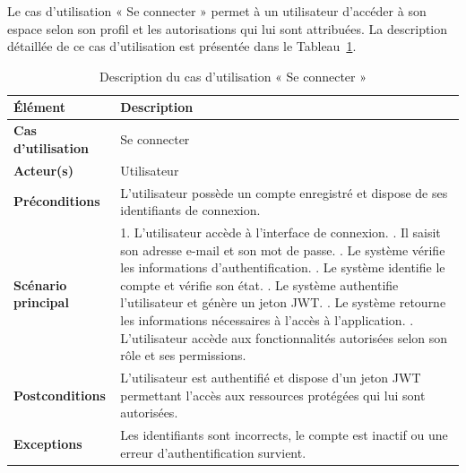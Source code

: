 Le cas d’utilisation « Se connecter » permet à un utilisateur d’accéder à son espace selon son profil et les autorisations qui lui sont attribuées. La description détaillée de ce cas d’utilisation est présentée dans le Tableau~\ref{tab:uc1}.

\begin{longtable}{|>{\raggedright\arraybackslash}p{4cm}|>{\raggedright\arraybackslash}p{10.5cm}|}

\caption{Description du cas d’utilisation « Se connecter »}
\label{tab:uc1}\\

\hline

\textbf{Élément} & \textbf{Description} \\

\hline

\textbf{Cas d’utilisation} & Se connecter \\

\hline

\textbf{Acteur(s)} & Utilisateur \\

\hline

\textbf{Préconditions} &
L'utilisateur possède un compte enregistré et dispose de ses identifiants de connexion. \\

\hline

\textbf{Scénario principal} &

1. L'utilisateur accède à l'interface de connexion. \newline
2. Il saisit son adresse e-mail et son mot de passe. \newline
3. Le système vérifie les informations d'authentification. \newline
4. Le système identifie le compte et vérifie son état. \newline
5. Le système authentifie l'utilisateur et génère un jeton JWT. \newline
6. Le système retourne les informations nécessaires à l'accès à l'application. \newline
7. L'utilisateur accède aux fonctionnalités autorisées selon son rôle et ses permissions. \\

\hline

\textbf{Postconditions} &
L'utilisateur est authentifié et dispose d'un jeton JWT permettant l'accès aux ressources protégées qui lui sont autorisées. \\

\hline

\textbf{Exceptions} &
Les identifiants sont incorrects, le compte est inactif ou une erreur d'authentification survient. \\

\hline

\end{longtable}

